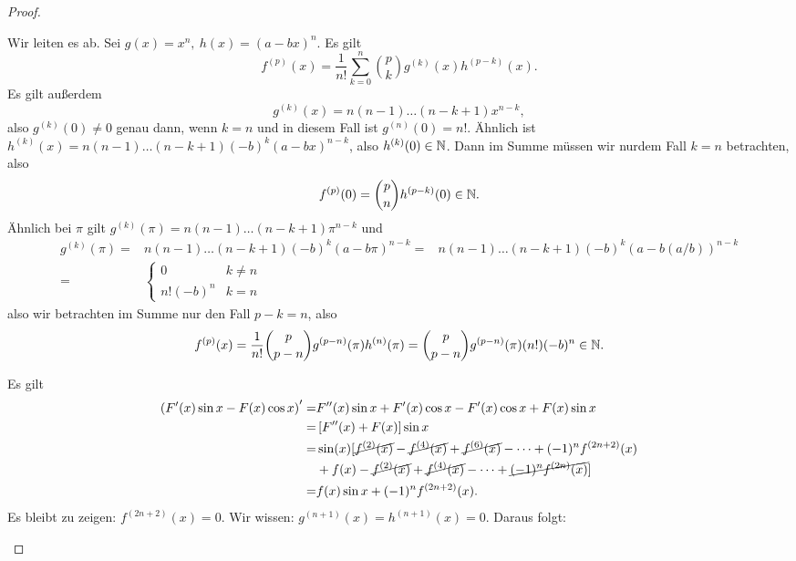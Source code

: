 \begin{proof}
	\begin{parts}
	\item Wir leiten es ab. Sei $g(x)=x^n,~h(x)=(a-bx)^n$. Es gilt
		\[
			f^{(p)}(x)=\frac{1}{n!}\sum_{k=0}^n \binom{p}{k}g^{(k)}(x)h^{(p-k)}(x)
		.\] 
		Es gilt außerdem
		\[
			g^{(k)}(x)=n(n-1)\dots(n-k+1)x^{n-k}
		,\]
		also $g^{(k)}(0)\neq 0$ genau dann, wenn $k=n$ und in diesem Fall ist $g^{(n)}(0)=n!$. Ähnlich ist $h^{(k)}(x)=n(n-1)\dots(n-k+1)(-b)^k(a-bx)^{n-k}$, also $h^{(k)}(0)\in \mathbb{N}$. Dann im Summe müssen wir nurdem Fall $k=n$ betrachten, also
		\[
			f^{(p)}(0)=\binom{p}{n}h^{(p-k)}(0)\in \mathbb{N}
		.\] 
		Ähnlich bei $\pi$ gilt $g^{(k)}(\pi)=n(n-1)\dots (n-k+1)\pi^{n-k}$ und
		\begin{align*}
			g^{(k)}(\pi)=&n(n-1)\dots(n-k+1)(-b)^k(a-b\pi)^{n-k}
=&n(n-1)\dots(n-k+1)(-b)^k(a-b(a / b))^{n-k}\\
=&\begin{cases}
	0 & k \neq n\\
	n!(-b)^n & k = n
\end{cases}
		\end{align*}
		also wir betrachten im Summe nur den Fall $p-k=n$, also
		\[
		f^{(p)}(x)=\frac{1}{n!}\binom{p}{p-n}g^{(p-n)}(\pi)h^{(n)}(\pi)=\binom{p}{p-n}g^{(p-n)}(\pi)(n!)(-b)^n\in \mathbb{N}
		.\] 
	\item Es gilt
		\begin{align*}
			\left( F'(x)\sin x-F(x)\cos x \right)'=& F''(x)\sin x+F'(x)\cos x-F'(x)\cos x+F(x)\sin x\\
			=& \left[ F''(x)+F(x) \right] \sin x\\
			=&\sin(x)[\cancel{f^{(2)}(x)}-\cancel{f^{(4)}(x)}+\cancel{f^{(6)}(x)}-\dots+(-1)^nf^{(2n+2)}(x)\\
			 &+f(x)-\cancel{f^{(2)}(x)}+\cancel{f^{(4)}(x)}-\dots+\cancel{(-1)^n f^{(2n)}(x)}]\\
			=&f(x)\sin x+(-1)^n f^{(2n+2)}(x).
		\end{align*}
		Es bleibt zu zeigen: $f^{(2n+2)}(x)=0$. Wir wissen: $g^{(n+1)}(x)=h^{(n+1)}(x)=0$. Daraus folgt:
	\end{parts}
\end{proof}
